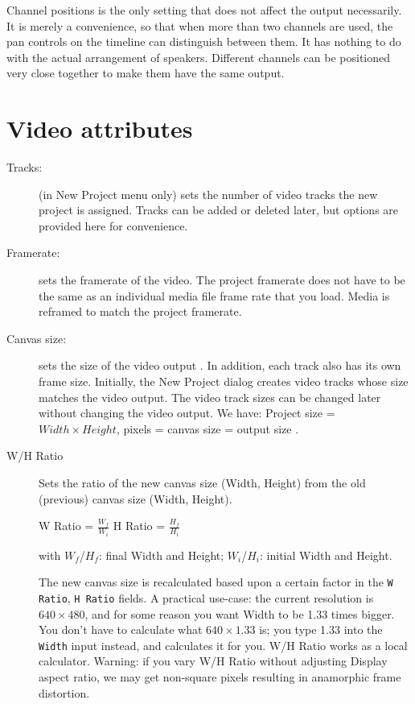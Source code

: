 \begin{description}
  Channel positions is the only setting that does not affect the
output necessarily.  It is merely a convenience, so that when more
than two channels are used, the pan controls on the timeline can
distinguish between them.  It has nothing to do with the actual
arrangement of speakers.  Different channels can be positioned very
close together to make them have the same output.
\end{description}


\section{Video attributes}%
\label{sec:video_attributes}

\begin{description}
\item[Tracks:] (in New Project menu only) sets the number of video
tracks the new project is assigned.  Tracks can be added or deleted
later, but options are provided here for convenience.

\item[Framerate:]  sets the framerate of the video.  The project
framerate does not have to be the same as an individual media file
frame rate that you load.  Media is reframed to match the project
framerate.

\item[Canvas size:]  sets the size of the video output . In addition,
each track also has its own frame size.  Initially, the New Project dialog creates video tracks whose size matches the video output.  The video track sizes can be changed later without changing the video output. We have: Project size = $Width \times Height$, pixels = canvas size = output size .

\item[W/H Ratio] Sets the ratio of the new canvas size (Width, Height) from the old (previous) canvas size (Width, Height).

\qquad W Ratio = $\frac{W_f}{W_i}$ \qquad H Ratio = $\frac{H_f}{H_i}$

with $W_f$/$H_f$: final Width and Height; $W_i$/$H_i$: initial Width and Height.

The new canvas size is recalculated based upon a certain factor in the \texttt{W Ratio}, \texttt{H Ratio} fields. A practical use-case: the current resolution is $640 \times 480$, and for some reason you want Width to be 1.33 times bigger. You don't have to calculate what $640 \times1.33$ is; you type 1.33 into the \texttt{Width} input instead, and \CGG{} calculates it for you. W/H Ratio works as a local calculator. Warning: if you vary W/H Ratio without adjusting Display aspect ratio, we may get non-square pixels resulting in anamorphic frame distortion.


\end{description}
